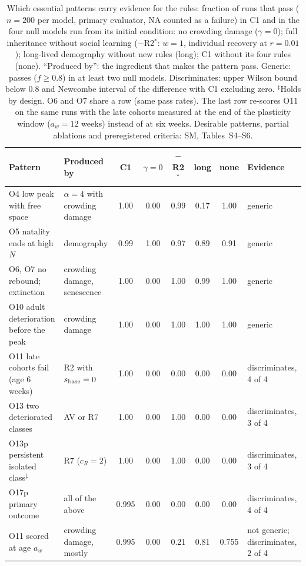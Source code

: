 \begin{table}[t]
  \centering
  \caption{Which essential patterns carry evidence for the rules: fraction of runs that pass ($n=200$ per model,
  primary evaluator, NA counted as a failure) in \textsf{C1} and in the four null models run from its initial
  condition: no crowding damage ($\gamma=0$); full inheritance without social learning ($-$R2$^*$: $w=1$,
  individual recovery at $r=0.01$); long-lived demography without new rules (long); \textsf{C1} without its four
  rules (none). ``Produced by'': the ingredient that makes the pattern pass. Generic: passes ($f\ge0.8$) in at
  least two null models. Discriminates: upper Wilson bound below 0.8 and Newcombe interval of the difference with
  \textsf{C1} excluding zero. $^\ddagger$Holds by design. O6 and O7 share a row (same pass rates). The last row
  re-scores O11 on the same runs with the late cohorts measured at the end of the plasticity window ($a_w=12$
  weeks) instead of at six weeks. Desirable patterns, partial ablations and preregistered criteria: SM, Tables~S4--S6.}
  \label{tab:res-null}
  \footnotesize
  \setlength{\tabcolsep}{2.7pt}
  \begin{tabular}{@{}llcccccl@{}}
    \toprule
    Pattern & Produced by & \textsf{C1} & $\gamma{=}0$ & $-$R2$^*$ & long & none & Evidence \\
    \midrule
    O4 low peak with free space & $\alpha=4$ with crowding damage & 1.00 & 0.00 & 0.99 & 0.17 & 1.00 & generic \\
    O5 natality ends at high $N$ & demography & 0.99 & 1.00 & 0.97 & 0.89 & 0.91 & generic \\
    O6, O7 no rebound; extinction & crowding damage, senescence & 1.00 & 0.00 & 1.00 & 0.99 & 1.00 & generic \\
    O10 adult deterioration before the peak & crowding damage & 1.00 & 0.00 & 1.00 & 1.00 & 1.00 & generic \\
    O11 late cohorts fail (age 6 weeks) & R2 with $s_{\rm base}=0$ & 1.00 & 0.00 & 0.00 & 0.00 & 0.00 & discriminates, 4 of 4 \\
    O13 two deteriorated classes & AV or R7 & 1.00 & 0.00 & 1.00 & 0.00 & 0.00 & discriminates, 3 of 4 \\
    O13p persistent isolated class$^\ddagger$ & R7 ($c_R=2$) & 1.00 & 0.00 & 1.00 & 0.00 & 0.00 & discriminates, 3 of 4 \\
    \midrule
    O17p primary outcome & all of the above & 0.995 & 0.00 & 0.00 & 0.00 & 0.00 & discriminates, 4 of 4 \\
    \midrule
    O11 scored at age $a_w$ & crowding damage, mostly & 0.995 & 0.00 & 0.21 & 0.81 & 0.755 & not generic; discriminates, 2 of 4 \\
    \bottomrule
  \end{tabular}
\end{table}

